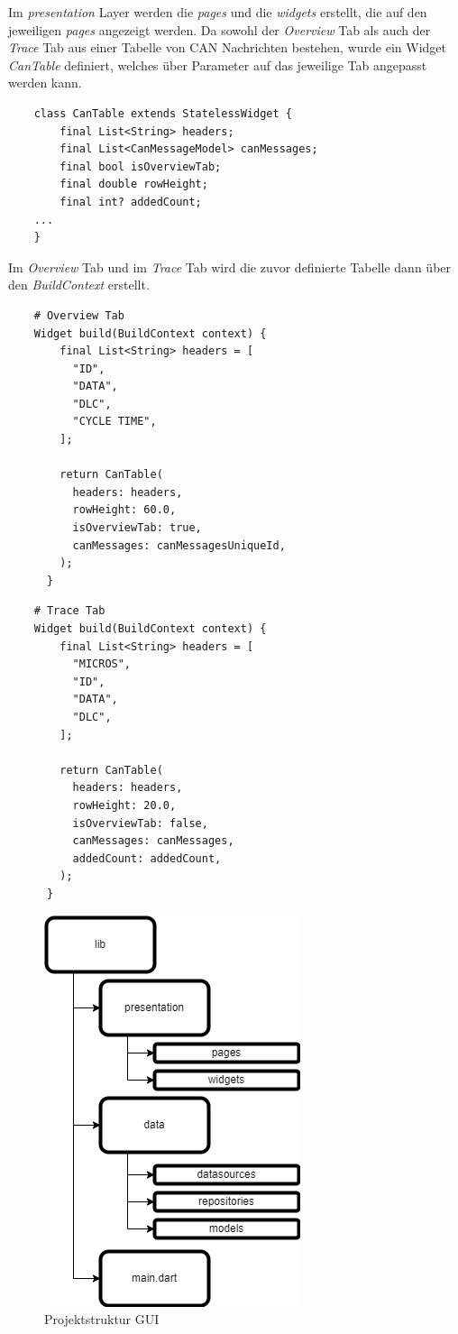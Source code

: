 Im \textit{presentation} Layer werden die \textit{pages} und die \textit{widgets} erstellt, die auf den jeweiligen \textit{pages} angezeigt werden. Da sowohl der \textit{Overview} Tab als auch der \textit{Trace} Tab aus einer Tabelle von CAN Nachrichten bestehen, wurde ein Widget \textit{CanTable} definiert, welches über Parameter auf das jeweilige Tab angepasst werden kann.
\begin{lstlisting}
    class CanTable extends StatelessWidget {
        final List<String> headers;
        final List<CanMessageModel> canMessages;
        final bool isOverviewTab;
        final double rowHeight;
        final int? addedCount;
    ...
    }      
\end{lstlisting}
Im \textit{Overview} Tab und im \textit{Trace} Tab wird die zuvor definierte Tabelle dann über den \textit{BuildContext} erstellt.
\begin{lstlisting}
    # Overview Tab
    Widget build(BuildContext context) {
        final List<String> headers = [
          "ID",
          "DATA",
          "DLC",
          "CYCLE TIME",
        ];
    
        return CanTable(
          headers: headers,
          rowHeight: 60.0,
          isOverviewTab: true,
          canMessages: canMessagesUniqueId,
        );
      }     
\end{lstlisting}
\begin{lstlisting}
    # Trace Tab
    Widget build(BuildContext context) {
        final List<String> headers = [
          "MICROS",
          "ID",
          "DATA",
          "DLC",
        ];
    
        return CanTable(
          headers: headers,
          rowHeight: 20.0,
          isOverviewTab: false,
          canMessages: canMessages,
          addedCount: addedCount,
        );
      }       
\end{lstlisting}

\begin{figure}
  \centering
  \includegraphics[height=0.7\textwidth]{img/projektstruktur_gui.png}
  \caption{Projektstruktur GUI}
  \label{fig:projektstruktur_gui}
\end{figure}